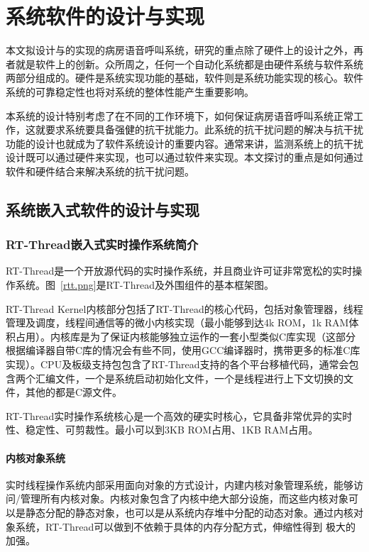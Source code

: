 
\chapter{系统软件的设计与实现}
本文拟设计与的实现的病房语音呼叫系统，研究的重点除了硬件上的设计之外，再者就是软件上的创新。众所周之，任何一个自动化系统都是由硬件系统与软件系统两部分组成的。硬件是系统实现功能的基础，软件则是系统功能实现的核心。软件系统的可靠稳定性也将对系统的整体性能产生重要影响。

本系统的设计特别考虑了在不同的工作环境下，如何保证病房语音呼叫系统正常工作，这就要求系统要具备强健的抗干扰能力。此系统的抗干扰问题的解决与抗干扰功能的设计也就成为了软件系统设计的重要内容。通常来讲，监测系统上的抗干扰设计既可以通过硬件来实现，也可以通过软件来实现。本文探讨的重点是如何通过软件和硬件结合来解决系统的抗干扰问题。

\section{系统嵌入式软件的设计与实现}
\subsection{RT-Thread嵌入式实时操作系统简介}
RT-Thread是一个开放源代码的实时操作系统，并且商业许可证非常宽松的实时操作系统。图~\ref{rtt.png}是RT-Thread及外围组件的基本框架图。

RT-Thread Kernel内核部分包括了RT-Thread的核心代码，包括对象管理器，线程管理及调度，线程间通信等的微小内核实现（最小能够到达4k ROM，1k RAM体积占用）。内核库是为了保证内核能够独立运作的一套小型类似C库实现（这部分根据编译器自带C库的情况会有些不同，使用GCC编译器时，携带更多的标准C库实现）。CPU及板级支持包包含了RT-Thread支持的各个平台移植代码，通常会包含两个汇编文件，一个是系统启动初始化文件，一个是线程进行上下文切换的文件，其他的都是C源文件。

RT-Thread实时操作系统核心是一个高效的硬实时核心，它具备非常优异的实时性、稳定性、可剪裁性。最小可以到3KB ROM占用、1KB RAM占用。

\subsubsection{内核对象系统}
实时线程操作系统内部采用面向对象的方式设计，内建内核对象管理系统，能够访问/管理所有内核对象。内核对象包含了内核中绝大部分设施，而这些内核对象可 以是静态分配的静态对象，也可以是从系统内存堆中分配的动态对象。通过内核对象系统，RT-Thread可以做到不依赖于具体的内存分配方式，伸缩性得到 极大的加强。

